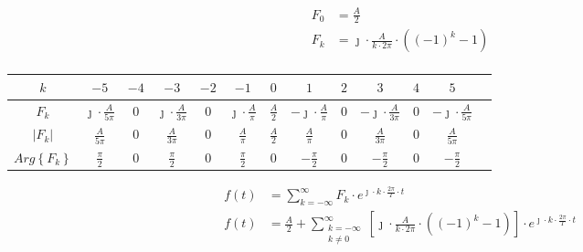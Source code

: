 \begin{task}
\begin{align*}
F_0&=\frac{A}{2}\\
F_k&=\jmath \cdot \frac{A}{k\cdot 2 \pi}\cdot \left( (-1)^{k} -1 \right)\\
\end{align*}


\begin{table}[H]
\centering  
\begin{tabular}{|c|c|c|c|c|c|c|c|c|c|c|c|c|}
  \hline 
  $k$ & $-5$ & $-4$ & $-3$ & $-2$ & $-1$ & $0$ & $1$ & $2$ & $3$ & $4$ & $5$\\ 
  \hline 
  $F_k$ & $\jmath \cdot \frac{A}{5 \pi}$ & $0$ & $\jmath \cdot \frac{A}{3 \pi}$ & $0$ & $\jmath \cdot \frac{A}{\pi}$ & $\frac{A}{2}$ & $-\jmath \cdot \frac{A}{\pi}$ & $0$ & $-\jmath \cdot \frac{A}{3 \pi}$ & $0$ & $-\jmath \cdot \frac{A}{5 \pi}$\\ 
  \hline 
  $\left| F_k \right|$ & $\frac{A}{5 \pi}$ & $0$ & $\frac{A}{3 \pi}$ & $0$ & $\frac{A}{\pi}$ & $\frac{A}{2}$ & $\frac{A}{\pi}$ & $0$ & $\frac{A}{3 \pi}$ & $0$ & $\frac{A}{5 \pi}$\\
  \hline
  $Arg\left\{ F_k \right\}$ & $\frac{\pi}{2}$ & $0$ & $\frac{\pi}{2}$ & $0$ & $\frac{\pi}{2}$ & $0$ & $-\frac{\pi}{2}$ & $0$ & $-\frac{\pi}{2}$ & $0$ & $-\frac{\pi}{2}$\\
  \hline
\end{tabular} 
\end{table}


\begin{equation}
\begin{aligned}
f(t) &= \sum_{k=-\infty}^{\infty} F_k \cdot e^{\jmath \cdot k \cdot \frac{2\pi}{T} \cdot t}\\
f(t) &= \frac{A}{2}+\sum_{\begin{smallmatrix}k=-\infty \\ k \neq 0 \end{smallmatrix}}^{\infty} \left[\jmath \cdot \frac{A}{k\cdot 2 \pi}\cdot \left( (-1)^{k} -1 \right)\right] \cdot e^{\jmath \cdot k \cdot \frac{2\pi}{T} \cdot t}
\end{aligned}
\end{equation}


\end{task}

